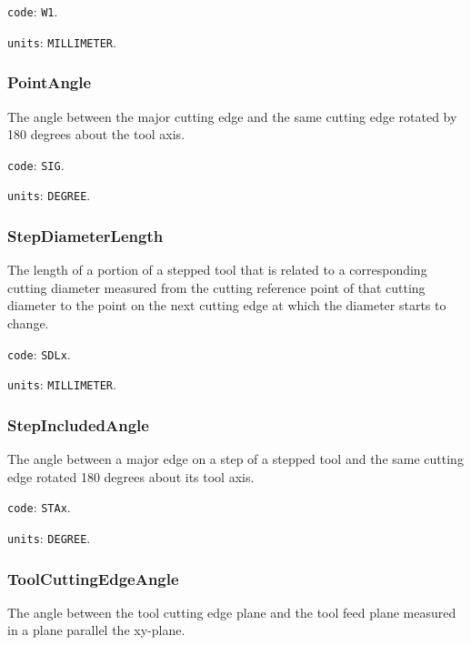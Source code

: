 \texttt{code}: \texttt{W1}.


\texttt{units}: \texttt{MILLIMETER}.



\subsubsection{PointAngle}
\label{sec:PointAngle}



The angle between the major cutting edge and the same cutting edge rotated by 180 degrees about the tool axis.


\texttt{code}: \texttt{SIG}.


\texttt{units}: \texttt{DEGREE}.



\subsubsection{StepDiameterLength}
\label{sec:StepDiameterLength}



The length of a portion of a stepped tool that is related to a corresponding cutting diameter measured from the cutting reference point of that cutting diameter to the point on the next cutting edge at which the diameter starts to change.


\texttt{code}: \texttt{SDLx}.


\texttt{units}: \texttt{MILLIMETER}.



\subsubsection{StepIncludedAngle}
\label{sec:StepIncludedAngle}



The angle between a major edge on a step of a stepped tool and the same cutting edge rotated 180 degrees about its tool axis.


\texttt{code}: \texttt{STAx}.


\texttt{units}: \texttt{DEGREE}.



\subsubsection{ToolCuttingEdgeAngle}
\label{sec:ToolCuttingEdgeAngle}



The angle between the tool cutting edge plane and the tool feed plane measured in a plane parallel the xy-plane.


